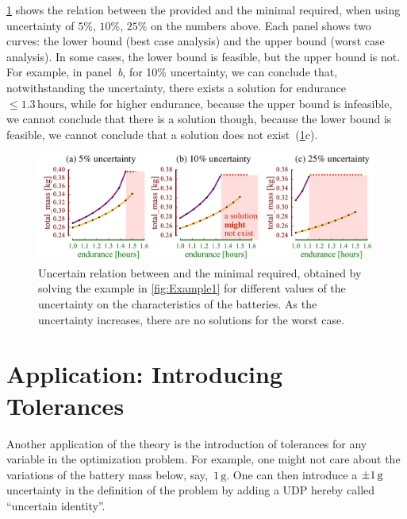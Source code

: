 \cref{fig:unc_battery_uncertain} shows the relation between
the provided  and the minimal  required,
when using uncertainty of $5\%$, $10\%$, $25\%$ on the numbers
above. Each panel shows two curves: the lower bound (best case analysis)
and the upper bound (worst case analysis). In some cases, the lower
bound is feasible, but the upper bound is not. For example, in panel~\emph{b},
for 10\% uncertainty, we can conclude that, notwithstanding the uncertainty,
there exists a solution for endurance~$\leq1.3\,\text{hours}$, while
for higher endurance, because the upper bound is infeasible, we cannot
conclude that there is a solution \textemdash{} though, because the
lower bound is feasible, we cannot conclude that a solution does not
exist~(\cref{fig:unc_battery_uncertain}c).
\begin{center}
  \begin{figure}[h]
    \begin{centering}
      \includegraphics[scale=0.33]{unc_battery_uncertain}
    \end{centering}
    \caption{Uncertain relation between 
    and the minimal  required, obtained by solving the
    example in \cref{fig:Example1} for different values of the uncertainty
    on the characteristics of the batteries. As the uncertainty increases,
    there are no solutions for the worst case.}
    \label{fig:unc_battery_uncertain}
  \end{figure}
\end{center}

\section{Application: Introducing Tolerances\label{sec:Application-tolerance}}

Another application of the theory is the introduction of tolerances
for any variable in the optimization problem. For example, one might
not care about the variations of the battery mass below, say,~$1\,\text{g}$.
One can then introduce a $\pm1\,\text{\ensuremath{\text{g}} }$ uncertainty
in the definition of the problem by adding a UDP hereby called ``uncertain
identity''.


